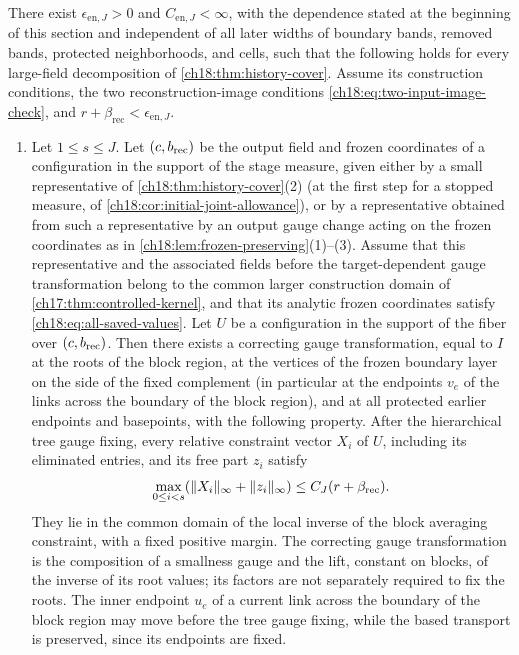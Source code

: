 \begin{theorem}\label{ch18:thm:all-point-enclosure}
There exist $\epsilon_{\mathrm{en},J}>0$ and $C_{\mathrm{en},J}<\infty$, with the dependence stated at the beginning of this section and independent of all later widths of boundary bands, removed bands, protected neighborhoods, and cells, such that the following holds for every large-field decomposition of \cref{ch18:thm:history-cover}. Assume its construction conditions, the two reconstruction-image conditions \eqref{ch18:eq:two-input-image-check}, and $r+\beta_{\mathrm{rec}}<\epsilon_{\mathrm{en},J}$.
\begin{enumerate}
\item Let $1\le s\le J$. Let $(c,b_{\mathrm{rec}})$ be the output field and frozen coordinates of a configuration in the support of the stage measure, given either by a small representative of \cref{ch18:thm:history-cover}(2) (at the first step for a stopped measure, of \cref{ch18:cor:initial-joint-allowance}), or by a representative obtained from such a representative by an output gauge change acting on the frozen coordinates as in \cref{ch18:lem:frozen-preserving}(1)--(3). Assume that this representative and the associated fields before the target-dependent gauge transformation belong to the common larger construction domain of \cref{ch17:thm:controlled-kernel}, and that its analytic frozen coordinates satisfy \eqref{ch18:eq:all-saved-values}. Let $U$ be a configuration in the support of the fiber over $(c,b_{\mathrm{rec}})$. Then there exists a correcting gauge transformation, equal to $I$ at the roots of the block region, at the vertices of the frozen boundary layer on the side of the fixed complement (in particular at the endpoints $v_e$ of the links across the boundary of the block region), and at all protected earlier endpoints and basepoints, with the following property. After the hierarchical tree gauge fixing, every relative constraint vector $X_i$ of $U$, including its eliminated entries, and its free part $z_i$ satisfy
\[
 \max_{0\le i<s}(\lVert X_i\rVert_\infty+\lVert z_i\rVert_\infty)
                      \le C_J(r+\beta_{\mathrm{rec}}).
\]
They lie in the common domain of the local inverse of the block averaging constraint, with a fixed positive margin. The correcting gauge transformation is the composition of a smallness gauge and the lift, constant on blocks, of the inverse of its root values; its factors are not separately required to fix the roots. The inner endpoint $u_e$ of a current link across the boundary of the block region may move before the tree gauge fixing, while the based transport is preserved, since its endpoints are fixed.

\end{enumerate}
\end{theorem}
